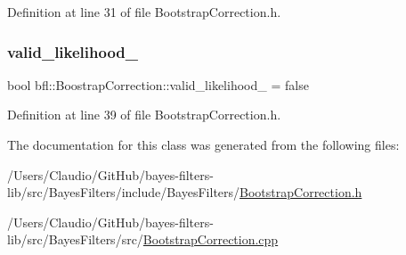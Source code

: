 Definition at line 31 of file Bootstrap\+Correction.\+h.

\mbox{\label{classbfl_1_1BoostrapCorrection_af61251e64b3d4c0b95af7a2fd6adf0c5}} 
\subsubsection{\texorpdfstring{valid\+\_\+likelihood\+\_\+}{valid\_likelihood\_}}
{\footnotesize\ttfamily bool bfl\+::\+Boostrap\+Correction\+::valid\+\_\+likelihood\+\_\+ = false\hspace{0.3cm}{\ttfamily [protected]}}



Definition at line 39 of file Bootstrap\+Correction.\+h.



The documentation for this class was generated from the following files\+:\begin{DoxyCompactItemize}
\item 
/\+Users/\+Claudio/\+Git\+Hub/bayes-\/filters-\/lib/src/\+Bayes\+Filters/include/\+Bayes\+Filters/\mbox{\hyperlink{BootstrapCorrection_8h}{Bootstrap\+Correction.\+h}}\item 
/\+Users/\+Claudio/\+Git\+Hub/bayes-\/filters-\/lib/src/\+Bayes\+Filters/src/\mbox{\hyperlink{BootstrapCorrection_8cpp}{Bootstrap\+Correction.\+cpp}}\end{DoxyCompactItemize}

